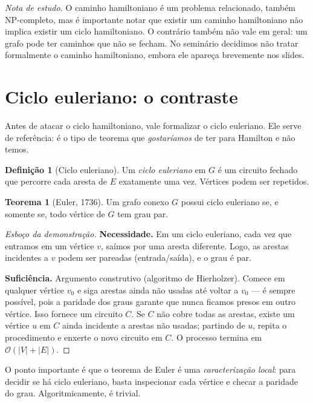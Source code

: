 \documentclass[11pt,a4paper]{article}
\theoremstyle{definition}
\newtheorem{defn}{Definição}[section]
\newtheorem{teo}{Teorema}[section]
\newcommand{\nota}[1]{%
  \par\medskip
  {\small\color{notagray}\textit{Nota de estudo.} #1}\par\medskip
}
\begin{document}
\nota{O caminho hamiltoniano é um problema relacionado, também NP-completo, mas é importante notar que existir um caminho hamiltoniano não implica existir um ciclo hamiltoniano. O contrário também não vale em geral: um grafo pode ter caminhos que não se fecham. No seminário decidimos não tratar formalmente o caminho hamiltoniano, embora ele apareça brevemente nos slides.}

\section{Ciclo euleriano: o contraste}

Antes de atacar o ciclo hamiltoniano, vale formalizar o ciclo euleriano. Ele serve de referência: é o tipo de teorema que \emph{gostaríamos} de ter para Hamilton e não temos.

\begin{defn}[Ciclo euleriano]
Um \emph{ciclo euleriano} em $G$ é um circuito fechado que percorre cada aresta de $E$ exatamente uma vez. Vértices podem ser repetidos.
\end{defn}

\begin{teo}[Euler, 1736]
Um grafo conexo $G$ possui ciclo euleriano se, e somente se, todo vértice de $G$ tem grau par.
\end{teo}

\begin{proof}[Esboço da demonstração]
\textbf{Necessidade.} Em um ciclo euleriano, cada vez que entramos em um vértice $v$, saímos por uma aresta diferente. Logo, as arestas incidentes a $v$ podem ser pareadas (entrada/saída), e o grau é par.

\textbf{Suficiência.} Argumento construtivo (algoritmo de Hierholzer). Comece em qualquer vértice $v_0$ e siga arestas ainda não usadas até voltar a $v_0$ --- é sempre possível, pois a paridade dos graus garante que nunca ficamos presos em outro vértice. Isso fornece um circuito $C$. Se $C$ não cobre todas as arestas, existe um vértice $u$ em $C$ ainda incidente a arestas não usadas; partindo de $u$, repita o procedimento e enxerte o novo circuito em $C$. O processo termina em $\mathcal{O}(|V| + |E|)$.
\end{proof}

O ponto importante é que o teorema de Euler é uma \emph{caracterização local}: para decidir se há ciclo euleriano, basta inspecionar cada vértice e checar a paridade do grau. Algoritmicamente, é trivial.
\end{document}

